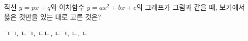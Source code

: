 \hspace*{2mm}\begin{minipage}[t]{\dimexpr\linewidth-2mm\relax}\vspace{0pt}
\noindent\begin{minipage}[t]{0.58\linewidth}\vspace{0pt}\raggedright 직선 $y=px+q$와 이차함수 $y=ax^2+bx+c$의 그래프가 그림과 같을 때, 보기에서 옳은 것만을 있는 대로 고른 것은?\end{minipage}\hfill\begin{minipage}[t]{0.4\linewidth}\vspace{0pt}\centering \resizebox{\ifdim\width>\linewidth\linewidth\else\width\fi}{!}{}\end{minipage}\par
\noindent {}
\begin{choices32}{ㄱ}{ㄱ, ㄴ}{ㄱ, ㄷ}{ㄴ, ㄷ}{ㄱ, ㄴ, ㄷ}\end{choices32}\end{minipage}
